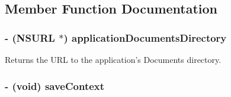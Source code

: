 \subsection{Member Function Documentation}
\hypertarget{interface_p_b_app_delegate_a13f63ca0981501b3ae86e9931049c2f9}{
\subsubsection[{applicationDocumentsDirectory}]{\setlength{\rightskip}{0pt plus 5cm}-\/ (NSURL $\ast$) applicationDocumentsDirectory }}
\label{interface_p_b_app_delegate_a13f63ca0981501b3ae86e9931049c2f9}
Returns the URL to the application's Documents directory. \hypertarget{interface_p_b_app_delegate_a8decfc0175ef3ecc9571f52ec9eb1fc7}{
\subsubsection[{saveContext}]{\setlength{\rightskip}{0pt plus 5cm}-\/ (void) saveContext }}
\label{interface_p_b_app_delegate_a8decfc0175ef3ecc9571f52ec9eb1fc7}


